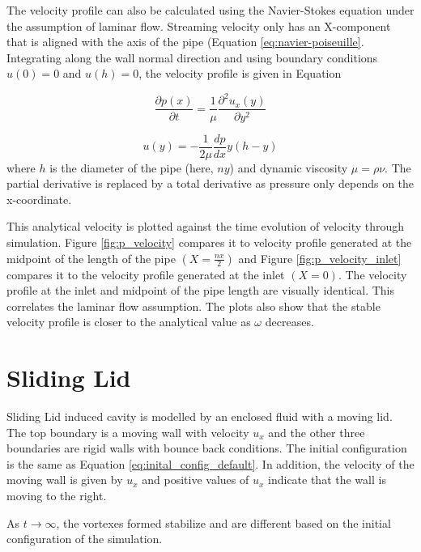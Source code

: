 \documentclass[a4paper,11pt]{report}
\begin{document}
The velocity profile can also be calculated using the Navier-Stokes equation under the assumption of laminar flow. \cite{PF_Mendiburu2009ANALYTICALSF} Streaming velocity only has an X-component that is aligned with the axis of the pipe (Equation \ref{eq:navier-poiseuille}. Integrating along the wall normal direction and using boundary conditions $u(0)=0$ and $u(h)=0$, the velocity profile is given in Equation

\begin{equation}
    \frac{\partial p \left( x \right)} {\partial t} = \frac1 \mu \frac{\partial^2 u_x \left( y \right)} {\partial y^2}
    \label{eq:navier-poiseuille}
\end{equation}

\begin{equation}
    u \left( y \right) = - \frac{1}{2 \mu} \frac{dp}{dx} y \left(h-y\right)
\end{equation}
where $h$ is the diameter of the pipe (here, $ny$) and dynamic viscosity $\mu=\rho\nu$. The partial derivative is replaced by a total derivative as pressure only depends on the x-coordinate.

This analytical velocity is plotted against the time evolution of velocity through simulation. Figure \ref{fig:p_velocity} compares it to velocity profile generated at the midpoint of the length of the pipe $(X = \frac{nx}{2})$ and Figure \ref{fig:p_velocity_inlet} compares it to the velocity profile generated at the inlet $(X = 0)$. The velocity profile at the inlet and midpoint of the pipe length are visually identical. This correlates the laminar flow assumption. The plots also show that the stable velocity profile is closer to the analytical value as $\omega$ decreases.

\section{Sliding Lid}
Sliding Lid induced cavity is modelled by an enclosed fluid with a moving lid. The top boundary is a moving wall with velocity $u_x$ and the other three boundaries are rigid walls with bounce back conditions. The initial configuration is the same as Equation \ref{eq:inital_config_default}. In addition, the velocity of the moving wall is given by $u_x$ and positive values of $u_x$ indicate that the wall is moving to the right.

As $t \rightarrow \infty$, the vortexes formed stabilize and are different based on the initial configuration of the simulation.
\end{document}
